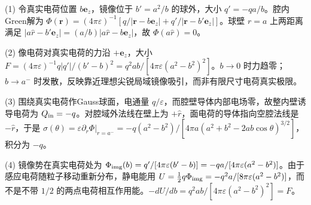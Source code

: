 (1) 令真实电荷位置 \(b\mathbf e_z\)，镜像位于 \(b'=a^2/b\) 的球外，大小 \(q'=-qa/b\)。腔内Green解为 \(\Phi(\mathbf r)=(4\pi\varepsilon)^{-1}[q/|\mathbf r-b\mathbf e_z|+q'/|\mathbf r-b'\mathbf e_z|]\)。球壁 \(r=a\) 上两距离满足 \(|a\hat r-b'\mathbf e_z|=(a/b)|a\hat r-b\mathbf e_z|\)，故 \(\Phi(a\hat r)=0\)。

(2) 像电荷对真实电荷的力沿 \(+\mathbf e_z\)，大小 \(F=(4\pi\varepsilon)^{-1}q|q'|/(b'-b)^2=q^2ab/[4\pi\varepsilon(a^2-b^2)^2]\)。\(b\to0\) 时力趋零；\(b\to a^-\) 时发散，反映靠近理想尖锐局域镜像吸引，而非有限尺寸电荷真实极限。

(3) 围绕真实电荷作Gauss球面，电通量 \(q/\varepsilon\)，而腔壁导体内部电场零，故整内壁诱导电荷为 \(Q_{\rm in}=-q\)。对腔域外法线在壁上为 \(+\hat r\)，面电荷的导体指向空腔法线是 \(-\hat r\)，于是 \(\sigma(\theta)=\varepsilon\partial_r\Phi|_{r=a^-}=-q(a^2-b^2)/[4\pi a(a^2+b^2-2ab\cos\theta)^{3/2}]\)，积分为 \(-q\)。

(4) 镜像势在真实电荷处为 \(\Phi_{\rm img}(b)=q'/[4\pi\varepsilon(b'-b)]=-qa/[4\pi\varepsilon(a^2-b^2)]\)。由于感应电荷随粒子移动重新分布，静电能用 \(U=\tfrac12q\Phi_{\rm img}=-q^2a/[8\pi\varepsilon(a^2-b^2)]\)，而不是不带 \(1/2\) 的两点电荷相互作用能。\(-dU/db=q^2ab/[4\pi\varepsilon(a^2-b^2)^2]=F\)。
